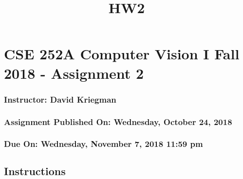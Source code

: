 \documentclass[11pt]{article}
\title{HW2}
\begin{document}
    
    
    \maketitle
    
    

    
    \section{CSE 252A Computer Vision I Fall 2018 - Assignment
2}\label{cse-252a-computer-vision-i-fall-2018---assignment-2}

\subsubsection{Instructor: David
Kriegman}\label{instructor-david-kriegman}

\subsubsection{Assignment Published On: Wednesday, October 24,
2018}\label{assignment-published-on-wednesday-october-24-2018}

\subsubsection{Due On: Wednesday, November 7, 2018 11:59
pm}\label{due-on-wednesday-november-7-2018-1159-pm}

\subsection{Instructions}\label{instructions}
\end{document}
